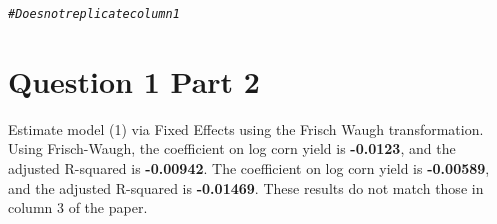 \documentclass[english, 11pt]{article}\usepackage[]{graphicx}\usepackage[]{color}
\makeatletter
\newcommand{\hlcom}[1]{\textcolor[rgb]{0.678,0.584,0.686}{\textit{#1}}}%
\newenvironment{kframe}{%
 \def\at@end@of@kframe{}%
 \ifinner\ifhmode%
  \def\at@end@of@kframe{\end{minipage}}%
  \begin{minipage}{\columnwidth}%
 \fi\fi%
 \def\FrameCommand##1{\hskip\@totalleftmargin \hskip-\fboxsep
 \colorbox{shadecolor}{##1}\hskip-\fboxsep
     \hskip-\linewidth \hskip-\@totalleftmargin \hskip\columnwidth}%
 \MakeFramed {\advance\hsize-\width
   \@totalleftmargin\z@ \linewidth\hsize
   \@setminipage}}%
 {\par\unskip\endMakeFramed%
 \at@end@of@kframe}
\newenvironment{knitrout}{}{} %
\makeatother
\begin{document}
\begin{knitrout}
\begin{kframe}
\begin{alltt}
\hlcom{# Does not replicate column 1 }
\end{alltt}
\end{kframe}
\end{knitrout}


\newpage
\noindent \section*{Question 1 Part 2} Estimate model (1) via Fixed Effects using the Frisch Waugh transformation. \\ 
\vspace{2mm}
\newline
\noindent Using Frisch-Waugh, the coefficient on log corn yield is \textbf{-0.0123}, and the adjusted R-squared is \textbf{-0.00942}. The coefficient on log corn yield is \textbf{-0.00589}, and the adjusted R-squared is \textbf{-0.01469}. These results do not match those in column 3 of the paper. 
\end{document}
